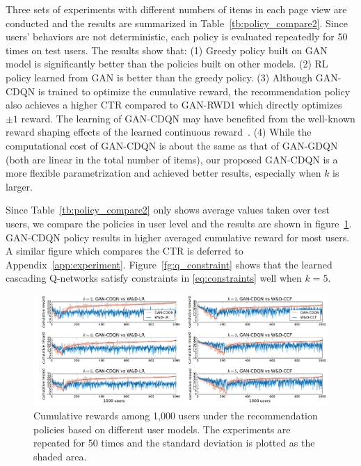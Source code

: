 \documentclass{article} %
\begin{document}
Three sets of experiments with different numbers of items in each page view are conducted and the results are summarized in Table~\ref{tb:policy_compare2}. Since users' behaviors are not deterministic, each policy is evaluated repeatedly for 50 times on test users. The results show that: (1) Greedy policy built on {\small GAN} model is significantly better than the policies built on other models. (2) RL policy learned from {\small GAN} is better than the greedy policy. (3) Although {\small GAN-CDQN} is trained to optimize the cumulative reward, the recommendation policy also achieves a higher CTR compared to {\small GAN-RWD1} which directly optimizes $\pm 1$ reward. The learning of {\small GAN-CDQN} may have benefited from the well-known reward shaping effects of the learned continuous reward~\citep{Mataric1994RewardFF,Ng1999PolicyIU,Matignon2006RewardFA}. (4) While the computational cost of {\small GAN-CDQN} is about the same as that of {\small GAN-GDQN} (both are linear in the total number of items), our proposed {\small GAN-CDQN} is a more flexible parametrization and achieved better results, especially when $k$ is larger.

Since Table~\ref{tb:policy_compare2} only shows average values taken over test users, we compare the policies in user level and the results are shown in figure~\ref{fg:policy_compare_rwd}. 
{\small GAN-CDQN} policy results in higher averaged cumulative reward for most users. A similar figure which compares the CTR is deferred to Appendix~\ref{app:experiment}. Figure~\ref{fg:q_constraint} shows that the learned cascading Q-networks satisfy constraints in \eqref{eq:constraints} well when $k=5$. 

\begin{figure}[ht!]
\vspace{-4mm}
\centering
\includegraphics[width=\textwidth]{Figs/compare_rwd_5000_2.pdf}	
\vspace{-7mm}
\caption{\small Cumulative rewards among 1,000 users under the recommendation policies based on different user models. The experiments are repeated for 50 times and the standard deviation is plotted as the shaded area.}
\label{fg:policy_compare_rwd}
\vspace{-3mm}
\end{figure}
\end{document}
